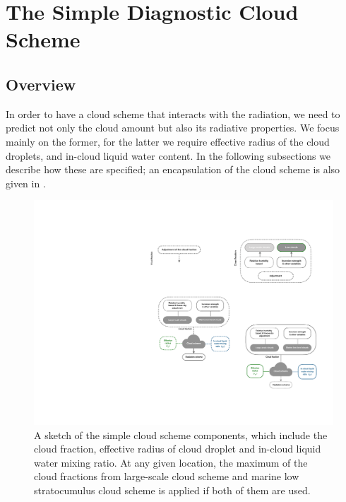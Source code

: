 \chapter{The Simple Diagnostic Cloud Scheme}


\section{Overview}

In order to have a cloud scheme that interacts with the radiation, we need to predict not only the cloud amount but also its radiative properties. We focus mainly on the former, for the latter we require effective radius of the cloud droplets, and in-cloud liquid water content. In the following subsections we describe how these are specified; an encapsulation of the cloud scheme is also given in . 

\begin{figure}[t]
	\centering
	\includegraphics[width=0.7\linewidth]{figs/chp3/diag_cld_scheme_summary.pdf}
	\caption{A sketch of the simple cloud scheme components, which include the cloud fraction, effective radius of cloud droplet and in-cloud liquid water mixing ratio. At any given location, the maximum of the cloud fractions from large-scale cloud scheme and marine low stratocumulus cloud scheme is applied if both of them are used.} 
	\label{fig:cld_scheme_summary}
\end{figure}


